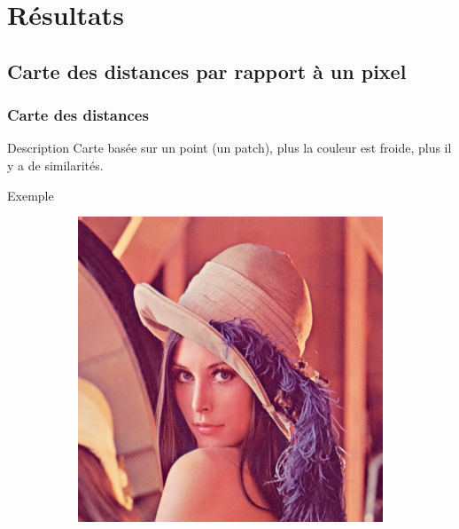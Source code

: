 \documentclass{beamer}
\begin{document}
\section{Résultats}
\subsection{Carte des distances par rapport à un pixel}
\begin{frame}
    \frametitle{Carte des distances}
    \begin{block}{Description}
        Carte basée sur un point (un patch), plus la couleur est froide, plus il y a de similarités.
    \end{block}
    \begin{exampleblock}{Exemple}
        \begin{figure}[h]
            \centering
            \hfill
            \begin{subfigure}{0.4\textwidth}
                \includegraphics[width=\textwidth]{img/lena}
                \caption{}
            \end{subfigure}
            \hfill
            \begin{subfigure}{0.4\textwidth}

\end{subfigure}
\end{figure}
\end{exampleblock}
\end{frame}
\end{document}
